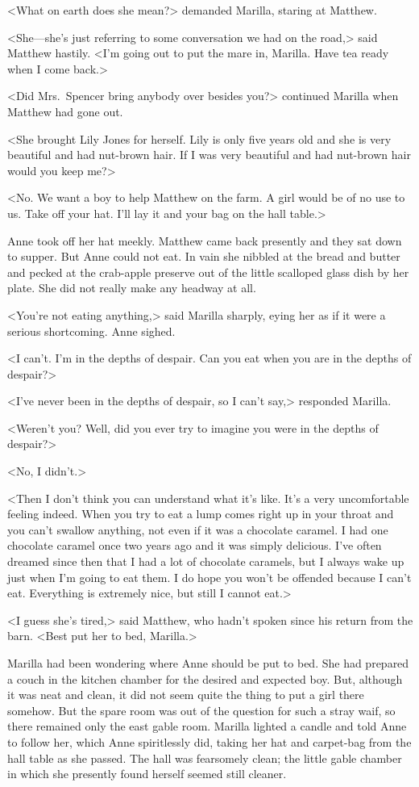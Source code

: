 <What on earth does she mean?> demanded Marilla, staring at Matthew.

<She—she's just referring to some conversation we had on the road,> said Matthew hastily. <I'm going out to put the mare in, Marilla. Have tea ready when I come back.>

<Did Mrs.~Spencer bring anybody over besides you?> continued Marilla when Matthew had gone out.

<She brought Lily Jones for herself. Lily is only five years old and she is very beautiful and had nut-brown hair. If I was very beautiful and had nut-brown hair would you keep me?>

<No. We want a boy to help Matthew on the farm. A girl would be of no use to us. Take off your hat. I'll lay it and your bag on the hall table.>

Anne took off her hat meekly. Matthew came back presently and they sat down to supper. But Anne could not eat. In vain she nibbled at the bread and butter and pecked at the crab-apple preserve out of the little scalloped glass dish by her plate. She did not really make any headway at all.

<You're not eating anything,> said Marilla sharply, eying her as if it were a serious shortcoming. Anne sighed.

<I can't. I'm in the depths of despair. Can you eat when you are in the depths of despair?>

<I've never been in the depths of despair, so I can't say,> responded Marilla.

<Weren't you? Well, did you ever try to imagine you were in the depths of despair?>

<No, I didn't.>

<Then I don't think you can understand what it's like. It's a very uncomfortable feeling indeed. When you try to eat a lump comes right up in your throat and you can't swallow anything, not even if it was a chocolate caramel. I had one chocolate caramel once two years ago and it was simply delicious. I've often dreamed since then that I had a lot of chocolate caramels, but I always wake up just when I'm going to eat them. I do hope you won't be offended because I can't eat. Everything is extremely nice, but still I cannot eat.>

<I guess she's tired,> said Matthew, who hadn't spoken since his return from the barn. <Best put her to bed, Marilla.>

Marilla had been wondering where Anne should be put to bed. She had prepared a couch in the kitchen chamber for the desired and expected boy. But, although it was neat and clean, it did not seem quite the thing to put a girl there somehow. But the spare room was out of the question for such a stray waif, so there remained only the east gable room. Marilla lighted a candle and told Anne to follow her, which Anne spiritlessly did, taking her hat and carpet-bag from the hall table as she passed. The hall was fearsomely clean; the little gable chamber in which she presently found herself seemed still cleaner.

